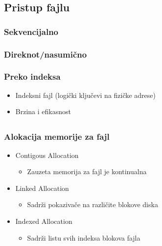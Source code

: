 \documentclass{beamer}
\begin{document}
\subsection*{Pristup fajlu}
\begin{frame}
    \frametitle{Sekvencijalno}
    \begin{center}
    \end{center}
\end{frame}

\begin{frame}
    \frametitle{Direknot/nasumično}
    \begin{center}
    \end{center}
\end{frame}

\begin{frame}
    \frametitle{Preko indeksa}
    \begin{itemize}
        \item Indeksni fajl (logički ključevi na fizičke adrese) \newline
        \item Brzina i efikasnost
    \end{itemize}
\end{frame}


\subsection*{}

\begin{frame}
    \frametitle{Alokacija memorije za fajl}
    \begin{itemize}
        \item Contigous Allocation \begin{itemize}
            \item Zauzeta memorija za fajl je kontinualna \newline
        \end{itemize}
        \item Linked Allocation \begin{itemize}
            \item Sadrži pokazivače na različite blokove diska \newline
        \end{itemize}
        \item Indexed Allocation \begin{itemize}
            \item Sadrži listu svih indeksa blokova fajla
        \end{itemize}
    \end{itemize}
\end{frame}
\end{document}
